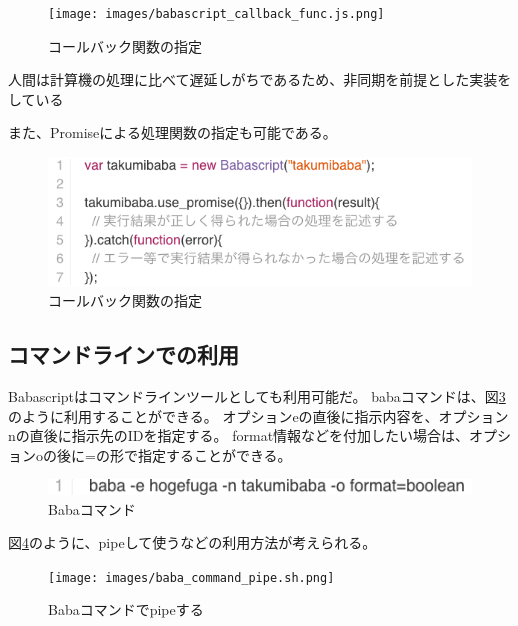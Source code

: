 \begin{figure}[htbp]
  \begin{center}
  \texttt{[image: images/babascript\_callback\_func.js.png]}
  \end{center}
  \caption{コールバック関数の指定}
  \label{fig:babascript_callback_func}
\end{figure}

人間は計算機の処理に比べて遅延しがちであるため、非同期を前提とした実装をしている

また、Promiseによる処理関数の指定も可能である。

\begin{figure}[htbp]
  \begin{center}
  \includegraphics[width=.5\linewidth,bb=0 0 574 513]{images/babascript_promise.js.png}
  \end{center}
  \caption{コールバック関数の指定}
  \label{fig:babascript_promise}
\end{figure}

\subsection{コマンドラインでの利用}\label{ux30b3ux30deux30f3ux30c9ux30e9ux30a4ux30f3ux3067ux306eux5229ux7528}

Babascriptはコマンドラインツールとしても利用可能だ。
babaコマンドは、図\ref{fig:baba_command}のように利用することができる。
オプションeの直後に指示内容を、オプションnの直後に指示先のIDを指定する。
format情報などを付加したい場合は、オプションoの後に=の形で指定することができる。

\begin{figure}[htbp]
  \begin{center}
  \includegraphics[width=.6\linewidth,bb=0 0 465 17]{images/baba_command.sh.png}
  \end{center}
  \caption{Babaコマンド}
  \label{fig:baba_command}
\end{figure}

図\ref{fig:baba_command_pipe}のように、pipeして使うなどの利用方法が考えられる。

\begin{figure}[htbp]
  \begin{center}
  \texttt{[image: images/baba\_command\_pipe.sh.png]}
  \end{center}
  \caption{Babaコマンドでpipeする}
  \label{fig:baba_command_pipe}
\end{figure}

